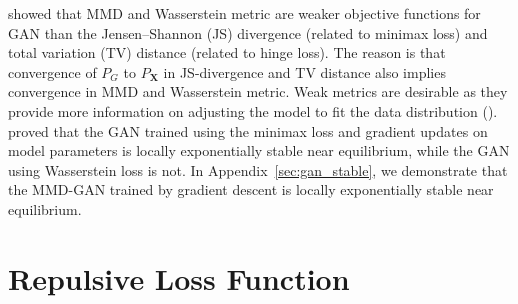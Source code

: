 \documentclass{article} %
\theoremstyle{plain}
\newtheorem*{proposition 1*}{Proposition 1}
\newcommand{\rdv}[1]{\mathbf{#1}}  %
\begin{document}
\cite{gan_convergence} showed that MMD and Wasserstein metric are weaker objective functions for GAN than the Jensen–Shannon (JS) divergence (related to minimax loss) and total variation (TV) distance (related to hinge loss). The reason is that convergence of \(P_G\) to \(P_{\rdv{X}}\) in JS-divergence and TV distance also implies convergence in MMD and Wasserstein metric. Weak metrics are desirable as they provide more information on adjusting the model to fit the data distribution (\cite{gan_convergence}). \cite{gan_stable} proved that the GAN trained using the minimax loss and gradient updates on model parameters is locally exponentially stable near equilibrium, while the GAN using Wasserstein loss is not. In Appendix~\ref{sec:gan_stable}, we demonstrate that the MMD-GAN trained by gradient descent is locally exponentially stable near equilibrium.

\section{Repulsive Loss Function}
\label{sec:repulsive_loss}
\end{document}
